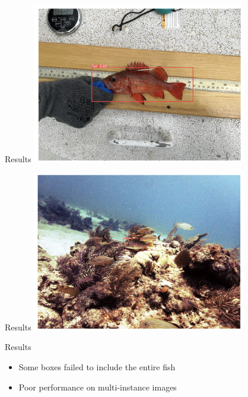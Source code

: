  \begin{frame}{Results}
    \centering
        \includegraphics[height=0.7\textheight,width=0.7\textwidth,keepaspectratio]{images/6.png}
    

 \end{frame}
 \begin{frame}{Results}
    \centering
        \includegraphics[height=0.7\textheight,width=0.7\textwidth,keepaspectratio]{images/7.png}
    

 \end{frame}

 \begin{frame}{Results}
   \begin{itemize}
      \item Some boxes failed to include the entire fish
      \item Poor performance on multi-instance images
   \end{itemize}
    



\end{frame}





